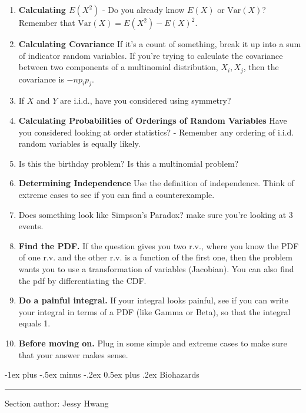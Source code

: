\documentclass[10pt,landscape]{article}
\makeatletter
\theoremstyle{definition}
\newcommand{\var}{\textrm{Var}}
\renewcommand{\section}{\@startsection{section}{1}{0mm}%
                                {-1ex plus -.5ex minus -.2ex}%
                                {0.5ex plus .2ex}%
                                {\normalfont\large\bfseries}}
\makeatother
\begin{document}
\begin{multicols}{3}
\begin{enumerate}
\item \textbf{Calculating $E(X^2)$} - Do you already know $E(X)$ or $\var(X)$? Remember that $\var(X) = E(X^2) - E(X)^2$.
\item \textbf{Calculating Covariance} If it's a count of something, break it up into a sum of indicator random variables. If you're trying to calculate the covariance between two components of a multinomial distribution, $X_i, X_j$, then the covariance is $-np_ip_j$.
\item If $X$ and $Y$ are i.i.d., have you considered using symmetry? 
\item \textbf{Calculating Probabilities of Orderings of Random Variables} Have you considered looking at order statistics? - Remember any ordering of i.i.d. random variables is equally likely.
\item Is this the birthday problem? Is this a multinomial problem?
\item \textbf{Determining Independence} Use the definition of independence. Think of extreme cases to see if you can find a counterexample.
\item Does something look like Simpson's Paradox? make sure you're looking at 3 events. 
\item \textbf{Find the PDF.} If the question gives you two r.v., where you know the PDF of one r.v. and the other r.v. is a function of the first one, then the problem wants you to use a transformation of variables (Jacobian). You can also find the pdf by differentiating the CDF.
\item \textbf{Do a painful integral.} If your integral looks painful, see if you can write your integral in terms of a PDF (like Gamma or Beta), so that the integral equals 1.
\item \textbf{Before moving on.} Plug in some simple and extreme cases to make sure that your answer makes sense.
\end{enumerate}


\section{Biohazards} \smallskip \hrule height 2pt \smallskip

Section author: Jessy Hwang


\end{multicols}
\end{document}
